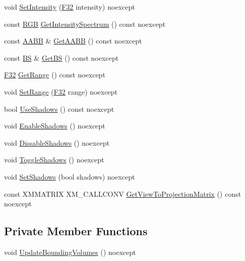 \begin{DoxyCompactItemize}
\item 
void \hyperlink{classmage_1_1_omni_light_add3fece8f288f4d4b55357143faa490b}{Set\+Intensity} (\hyperlink{namespacemage_aa97e833b45f06d60a0a9c4fc22ae02c0}{F32} intensity) noexcept
\item 
const \hyperlink{structmage_1_1_r_g_b}{R\+GB} \hyperlink{classmage_1_1_omni_light_a89ce7086bd33e1d419dbd755316daf2e}{Get\+Intensity\+Spectrum} () const noexcept
\item 
const \hyperlink{classmage_1_1_a_a_b_b}{A\+A\+BB} \& \hyperlink{classmage_1_1_omni_light_a13fd21cba1f757156ceb6e2ba298ce07}{Get\+A\+A\+BB} () const noexcept
\item 
const \hyperlink{classmage_1_1_b_s}{BS} \& \hyperlink{classmage_1_1_omni_light_ad38916c3db0ece0ef0b23044c827a425}{Get\+BS} () const noexcept
\item 
\hyperlink{namespacemage_aa97e833b45f06d60a0a9c4fc22ae02c0}{F32} \hyperlink{classmage_1_1_omni_light_a1c829777c2afc850dd66382bc0115d8d}{Get\+Range} () const noexcept
\item 
void \hyperlink{classmage_1_1_omni_light_a696ec6a022ccc3993d88c1d435938fb1}{Set\+Range} (\hyperlink{namespacemage_aa97e833b45f06d60a0a9c4fc22ae02c0}{F32} range) noexcept
\item 
bool \hyperlink{classmage_1_1_omni_light_a8d58e7e1b26e54b3d9785ca79213cc4f}{Use\+Shadows} () const noexcept
\item 
void \hyperlink{classmage_1_1_omni_light_ad7c2e780dc83eb63fa44e1475492e192}{Enable\+Shadows} () noexcept
\item 
void \hyperlink{classmage_1_1_omni_light_a2353a53e336ffb55be9949ea6f1d8979}{Dissable\+Shadows} () noexcept
\item 
void \hyperlink{classmage_1_1_omni_light_a19164a13e884bce6fbc80b760c82d243}{Toggle\+Shadows} () noexcept
\item 
void \hyperlink{classmage_1_1_omni_light_a337082a4e6026fe6f98098df063e6660}{Set\+Shadows} (bool shadows) noexcept
\item 
const X\+M\+M\+A\+T\+R\+IX X\+M\+\_\+\+C\+A\+L\+L\+C\+O\+NV \hyperlink{classmage_1_1_omni_light_abae044c80634cfc6d15a0e21e7a55b5d}{Get\+View\+To\+Projection\+Matrix} () const noexcept
\end{DoxyCompactItemize}
\subsection*{Private Member Functions}
\begin{DoxyCompactItemize}
\item 
void \hyperlink{classmage_1_1_omni_light_a6a10cdc0ed276d68e5378eaf934158e1}{Update\+Bounding\+Volumes} () noexcept
\end{DoxyCompactItemize}
